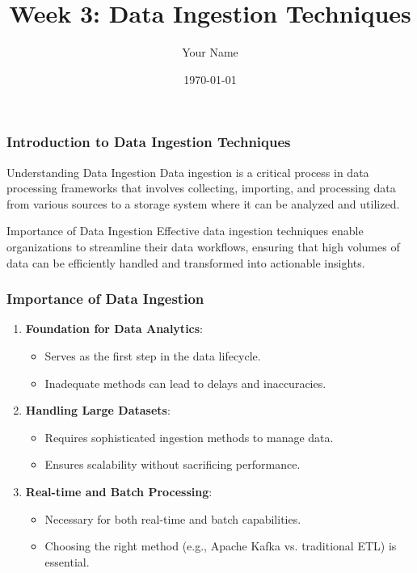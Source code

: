 \documentclass{beamer}
\title{Week 3: Data Ingestion Techniques}
\author{Your Name}
\institute{Your Institution}
\date{\today}
\begin{document}
\frame{\titlepage}

\begin{frame}[fragile]
    \frametitle{Introduction to Data Ingestion Techniques}
    \begin{block}{Understanding Data Ingestion}
        Data ingestion is a critical process in data processing frameworks that involves collecting, importing, and processing data from various sources to a storage system where it can be analyzed and utilized. 
    \end{block}
    
    \begin{block}{Importance of Data Ingestion}
        Effective data ingestion techniques enable organizations to streamline their data workflows, ensuring that high volumes of data can be efficiently handled and transformed into actionable insights.
    \end{block}
\end{frame}

\begin{frame}[fragile]
    \frametitle{Importance of Data Ingestion}
    \begin{enumerate}
        \item \textbf{Foundation for Data Analytics}:
            \begin{itemize}
                \item Serves as the first step in the data lifecycle.
                \item Inadequate methods can lead to delays and inaccuracies.
            \end{itemize}
        \item \textbf{Handling Large Datasets}:
            \begin{itemize}
                \item Requires sophisticated ingestion methods to manage data.
                \item Ensures scalability without sacrificing performance.
            \end{itemize}
        \item \textbf{Real-time and Batch Processing}:
            \begin{itemize}
                \item Necessary for both real-time and batch capabilities.
                \item Choosing the right method (e.g., Apache Kafka vs. traditional ETL) is essential.
            \end{itemize}
    \end{enumerate}
\end{frame}
\end{document}
